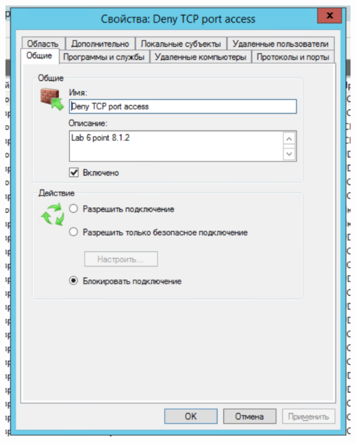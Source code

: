 \documentclass[a4paper,14pt]{extarticle}
\begin{document}
    \begin{center}
        \includegraphics[scale=0.7]{8.2.1.png}
    \end{center}
\end{document}
